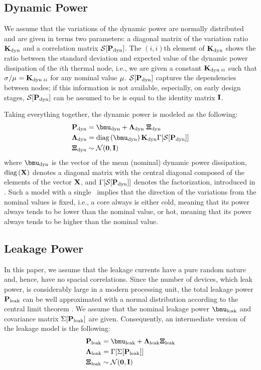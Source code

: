 \subsection{Dynamic Power}
We assume that the variations of the dynamic power are normally distributed and are given in terms two parameters: a diagonal matrix of the variation ratio $\mathbf{K}_{\text{dyn}}$ and a correlation matrix $\mathcal{S}[{\mathbf{P}_{\text{dyn}}}]$. The $(i,i)$th element of $\mathbf{K}_{\text{dyn}}$ shows the ratio between the standard deviation and expected value of the dynamic power dissipation of the $i$th thermal node, i.e., we are given a constant $\mathbf{K}_{\text{dyn} \; ii}$ such that $\sigma_{}/\mu_{} = \mathbf{K}_{\text{dyn} \; ii}$ for any nominal value $\mu_{}$. $\mathcal{S}[{\mathbf{P}_{\text{dyn}}}]$ captures the dependencies between nodes; if this information is not available, especially, on early design stages, $\mathcal{S}[{\mathbf{P}_{\text{dyn}}}]$ can be assumed to be is equal to the identity matrix $\mathbf{I}$.

Taking everything together, the dynamic power is modeled as the following:
\begin{align} \equlabel{dynamic-power}
  & \vpower_\dyn = \vmean{\dyn} + \ddev{\dyn} \; \vnormal_\dyn \\
  & \ddev{\dyn} = \diag{\vmean{\dyn}} \mratio_\dyn \factorize{\corr{\vpower_\dyn}} \nonumber \\
  & \vnormal_\dyn \sim \normal(\vzero, \mone) \nonumber
\end{align}
where $\vmean{\dyn}$ is the vector of the mean (nominal) dynamic power dissipation, $\text{diag}\left(\mathbf{X}\right)$ denotes a diagonal matrix with the central diagonal composed of the elements of the vector $\mathbf{X}$, and $\Gamma[\mathcal{S}[{\mathbf{P}_{\text{dyn}}}]]$ denotes the factorization, introduced in . Such a model with a single \mrv\ implies that the direction of the variations from the nominal values is fixed, i.e., a core always is either cold, meaning that its power always tends to be lower than the nominal value, or hot, meaning that its power always tends to be higher than the nominal value.

\subsection{Leakage Power}
In this paper, we assume that the leakage currents have a pure random nature and, hence, have no spacial correlations. Since the number of devices, which leak power, is considerably large in a modern processing unit, the total leakage power $\mathbf{P}_{\text{leak}}$ can be well approximated with a normal distribution \cite{srivastava2010} according to the central limit theorem \cite{durrett2010}. We assume that the nominal leakage power $\vmean{\leak}$ and covariance matrix $\Sigma[\mathbf{P}_{\text{leak}}]$ are given. Consequently, an intermediate version of the leakage model is the following:
\begin{align*}
  & \vpower_\leak = \vmean{\leak} + \ddev{\leak} \vnormal_\leak \\
  & \ddev{\leak} = \factorize{\cov{\vpower_\leak}} \\
  & \vnormal_\leak \sim \normal(\vzero, \mone)
\end{align*}


